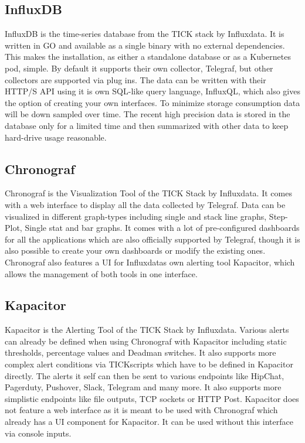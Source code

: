 \subsection{InfluxDB}
InfluxDB is the time-series database from the TICK stack by Influxdata. It is written in GO and available as a single binary with no external dependencies. This makes the installation, as either a standalone database or as a Kubernetes pod, simple.
By default it supports their own collector, Telegraf, but other collectors are supported via plug ins. The data can be written with their  HTTP/S API using it is own SQL-like query language, InfluxQL, which also gives the option of creating your own interfaces.
To minimize storage consumption data will be down sampled over time. The recent high precision data is stored in the database only for a limited time and then summarized with other data to keep hard-drive usage reasonable. 
\subsection{Chronograf}
Chronograf is the Visualization Tool of the TICK Stack by Influxdata. It comes with a web interface to display all the data collected by Telegraf. Data can be visualized in different graph-types including single and stack line graphs, Step-Plot, Single stat and bar graphs. It comes with a lot of pre-configured dashboards for all the applications which are also officially supported by Telegraf, though it is also possible to create your own dashboards or modify the existing ones. 
Chronograf also features a UI for Influxdatas own alerting tool Kapacitor, which allows the management of both tools in one interface.
\subsection{Kapacitor}
Kapacitor is the Alerting Tool of the TICK Stack by Influxdata. Various alerts can already be defined when using Chronograf with Kapacitor including static thresholds, percentage values and Deadman switches. It also supports more complex alert conditions via TICKscripts which have to be defined in Kapacitor directly.
The alerts it self can then be sent to various endpoints like HipChat, Pagerduty, Pushover, Slack, Telegram and many more. It also supports more simplistic endpoints like file outputs, TCP sockets or HTTP Post.
Kapacitor does not feature a web interface as it is meant to be used with Chronograf which already has a UI component for Kapacitor. It can be used without this interface via console inputs.
